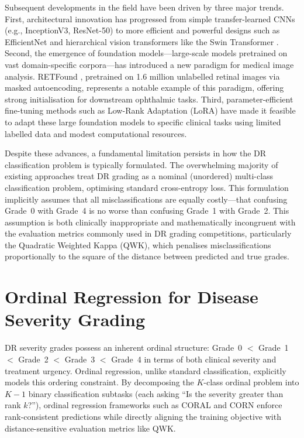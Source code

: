 Subsequent developments in the field have been driven by three major trends. First, architectural innovation has progressed from simple transfer-learned CNNs (e.g., InceptionV3, ResNet-50) to more efficient and powerful designs such as EfficientNet \cite{tan2019efficientnet} and hierarchical vision transformers like the Swin Transformer \cite{liu2021swin}. Second, the emergence of foundation models---large-scale models pretrained on vast domain-specific corpora---has introduced a new paradigm for medical image analysis. RETFound \cite{zhou2023retfound}, pretrained on 1.6 million unlabelled retinal images via masked autoencoding, represents a notable example of this paradigm, offering strong initialisation for downstream ophthalmic tasks. Third, parameter-efficient fine-tuning methods such as Low-Rank Adaptation (LoRA) \cite{hu2022lora} have made it feasible to adapt these large foundation models to specific clinical tasks using limited labelled data and modest computational resources.

Despite these advances, a fundamental limitation persists in how the DR classification problem is typically formulated. The overwhelming majority of existing approaches treat DR grading as a nominal (unordered) multi-class classification problem, optimising standard cross-entropy loss. This formulation implicitly assumes that all misclassifications are equally costly---that confusing Grade~0 with Grade~4 is no worse than confusing Grade~1 with Grade~2. This assumption is both clinically inappropriate and mathematically incongruent with the evaluation metrics commonly used in DR grading competitions, particularly the Quadratic Weighted Kappa (QWK), which penalises misclassifications proportionally to the square of the distance between predicted and true grades.

\section{Ordinal Regression for Disease Severity Grading}
\label{sec:ordinal_motivation}

DR severity grades possess an inherent ordinal structure: Grade~0 $<$ Grade~1 $<$ Grade~2 $<$ Grade~3 $<$ Grade~4 in terms of both clinical severity and treatment urgency. Ordinal regression, unlike standard classification, explicitly models this ordering constraint. By decomposing the $K$-class ordinal problem into $K-1$ binary classification subtasks (each asking ``Is the severity greater than rank $k$?''), ordinal regression frameworks such as CORAL \cite{cao2020rank} and CORN \cite{shi2021corn} enforce rank-consistent predictions while directly aligning the training objective with distance-sensitive evaluation metrics like QWK.

